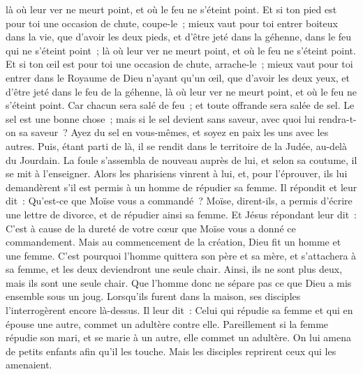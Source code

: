 \begin{multicols}{2}
là où leur ver ne meurt point, et où le feu ne s'éteint point.
Et si ton pied est pour toi une occasion de chute, coupe-le~; mieux vaut pour toi entrer boiteux dans la vie, que d'avoir les deux pieds, et d'être jeté dans la géhenne, dans le feu qui ne s'éteint point~;
là où leur ver ne meurt point, et où le feu ne s'éteint point.
Et si ton œil est pour toi une occasion de chute, arrache-le~; mieux vaut pour toi entrer dans le Royaume de Dieu n'ayant qu'un œil, que d'avoir les deux yeux, et d'être jeté dans le feu de la géhenne,
là où leur ver ne meurt point, et où le feu ne s'éteint point.
Car chacun sera salé de feu~; et toute offrande sera salée de sel.
Le sel est une bonne chose~; mais si le sel devient sans saveur, avec quoi lui rendra-t-on sa saveur~?
Ayez du sel en vous-mêmes, et soyez en paix les uns avec les autres.
\VerseOne{}Puis, étant parti de là, il se rendit dans le territoire de la Judée, au-delà du Jourdain. La foule s'assembla de nouveau auprès de lui, et selon sa coutume, il se mit à l'enseigner.
Alors les pharisiens vinrent à lui, et, pour l'éprouver, ils lui demandèrent s'il est permis à un homme de répudier sa femme.
Il répondit et leur dit~: Qu'est-ce que Moïse vous a commandé~?
Moïse, dirent-ils, a permis d'écrire une lettre de divorce, et de répudier ainsi sa femme.
Et Jésus répondant leur dit~: C'est à cause de la dureté de votre cœur que Moïse vous a donné ce commandement.
Mais au commencement de la création, Dieu fit un homme et une femme.
C'est pourquoi l'homme quittera son père et sa mère, et s'attachera à sa femme,
et les deux deviendront une seule chair. Ainsi, ils ne sont plus deux, mais ils sont une seule chair.
Que l'homme donc ne sépare pas ce que Dieu a mis ensemble sous un joug.
Lorsqu'ils furent dans la maison, ses disciples l'interrogèrent encore là-dessus.
Il leur dit~: Celui qui répudie sa femme et qui en épouse une autre, commet un adultère contre elle.
Pareillement si la femme répudie son mari, et se marie à un autre, elle commet un adultère.
On lui amena de petits enfants afin qu'il les touche. Mais les disciples reprirent ceux qui les amenaient.

\end{multicols}
